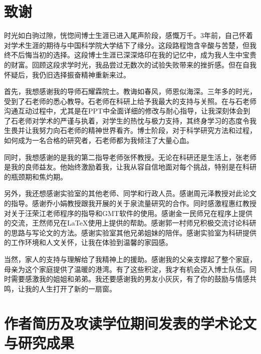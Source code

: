 \chapter[致谢]{致\quad 谢}

时光如白驹过隙，恍惚间博士生涯已进入尾声阶段，感慨万千。3年前，自己怀着对学术生涯的期待与中国科学院大学结下了缘分。这段路程饱含辛酸与苦楚，但我终不后悔当初的选择。这段博士生涯已深深烙印在我的记忆中，成为我人生中宝贵的财富。回顾这段求学时光，我品尝过无数次的试验失败带来的挫折感。但在自我怀疑后，我仍旧选择振奋精神重新来过。

首先，我想感谢我的导师石耀霖院士。教诲如春风，师恩似海深。三年多的时光，受到了石老师的悉心教导。石老师在科研上给予我最大的支持与关照。在与石老师沟通互动过程中，尤其是在PPT中全面详细的修改与耐心指导，让我深刻体会到了石老师对学术的严谨与执着，对学生的热忱与极力支持，其终身学习的态度令我生畏并让我努力向石老师的精神世界看齐。博士阶段，对于科学研究方法和过程，如何成为一名合格的研究者，石老师都为我倾注了大量心血。

同时，我想感谢的是我的第二指导老师张怀教授。无论在科研还是生活上，张老师是我的良师益友。他始终激励着我，让我从容自信地面对每个挑战，特别是在科研的瓶颈期和焦灼期。

另外，我还想感谢实验室的其他老师、同学和行政人员。感谢周元泽教授对此论文的指导。感谢乔小娟教授跟我开展的关于泉流量研究的合作。同时感激程惠红教授对关于汪荣江老师程序的指导和GMT软件的使用。感谢金一民师兄在程序上提供的交流，王然师兄在\LaTeX{}使用上提供的帮助。感谢郭一村师兄积极交流讨论科研的思路与写论文的方法。感谢实验室其他兄弟姐妹的陪伴。感谢实验室为科研提供的工作环境和人文关怀，让我在体验到温馨的家园感。

当然，家人的支持与理解给了我精神上的援助。感谢我的父亲支撑起了整个家庭，母亲为这个家庭提供了温暖的港湾。有了这些积淀，我才有机会迈入博士队伍。同时需要感激我的姐姐和弟弟。我还要感谢我的男友小灰灰，有了你的鼓励与情感共鸣，让我的人生打开了新的一扇窗。


\chapter{作者简历及攻读学位期间发表的学术论文与研究成果}

